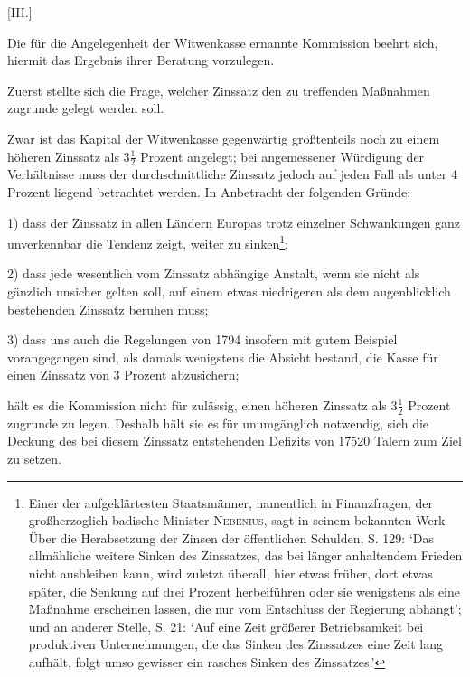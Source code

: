\par\bigskip{}
\begin{center}
[III.]\par{}
\end{center}
\noindent\hspace*{\parindent}Die für die Angelegenheit der Witwenkasse ernannte Kommission beehrt sich, hiermit das Ergebnis ihrer Beratung vorzulegen.

Zuerst stellte sich die Frage, welcher Zinssatz den zu treffenden Maßnahmen zugrunde gelegt werden soll.

Zwar ist das Kapital der Witwenkasse gegenwärtig größtenteils noch zu einem höheren Zinssatz als \(3\tfrac{1}{2}\) Prozent angelegt; bei angemessener Würdigung der Verhältnisse muss der durchschnittliche Zinssatz jedoch auf jeden Fall als unter 4 Prozent liegend betrachtet werden. In Anbetracht der folgenden Gründe:

1) dass der Zinssatz in allen Ländern Europas trotz einzelner Schwankungen ganz unverkennbar die Tendenz zeigt, weiter zu sinken\footnote{Einer der aufgeklärtesten Staatsmänner, namentlich in Finanzfragen, der großherzoglich badische Minister \textsc{Nebenius}, sagt in seinem bekannten Werk Über die Herabsetzung der Zinsen der öffentlichen Schulden, S. 129: ‘Das allmähliche weitere Sinken des Zinssatzes, das bei länger anhaltendem Frieden nicht ausbleiben kann, wird zuletzt überall, hier etwas früher, dort etwas später, die Senkung auf drei Prozent herbeiführen oder sie wenigstens als eine Maßnahme erscheinen lassen, die nur vom Entschluss der Regierung abhängt’; und an anderer Stelle, S. 21: ‘Auf eine Zeit größerer Betriebsamkeit bei produktiven Unternehmungen, die das Sinken des Zinssatzes eine Zeit lang aufhält, folgt umso gewisser ein rasches Sinken des Zinssatzes.’};

2) dass jede wesentlich vom Zinssatz abhängige Anstalt, wenn sie nicht als gänzlich unsicher gelten soll, auf einem etwas niedrigeren als dem augenblicklich bestehenden Zinssatz beruhen muss;

3) dass uns auch die Regelungen von 1794 insofern mit gutem Beispiel vorangegangen sind, als damals wenigstens die Absicht bestand, die Kasse für einen Zinssatz von 3 Prozent abzusichern;

\noindent hält es die Kommission nicht für zulässig, einen höheren Zinssatz als \(3\tfrac{1}{2}\) Prozent zugrunde zu legen. Deshalb hält sie es für unumgänglich notwendig, sich die Deckung des bei diesem Zinssatz entstehenden Defizits von 17520 Talern zum Ziel zu setzen.

